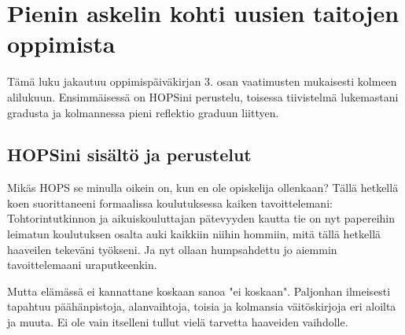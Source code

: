 \documentclass[utf8]{gradu3}
\begin{document}
\chapter{Pienin askelin kohti uusien taitojen oppimista}
\label{hopsJaGradu}

%
%
%
%
%
%
%

Tämä luku jakautuu oppimispäiväkirjan 3. osan vaatimusten mukaisesti kolmeen
alilukuun. Ensimmäisessä on HOPSini perustelu, toisessa tiivistelmä lukemastani
gradusta ja kolmannessa pieni reflektio graduun liittyen.

\section{HOPSini sisältö ja perustelut}

Mikäs HOPS se minulla oikein on, kun en ole opiskelija ollenkaan? Tällä hetkellä
koen suorittaneeni formaalissa koulutuksessa kaiken tavoittelemani:
Tohtorintutkinnon ja aikuiskouluttajan pätevyyden kautta tie on nyt papereihin
leimatun koulutuksen osalta auki kaikkiin niihin hommiin, mitä tällä hetkellä
haaveilen tekeväni työkseni. Ja nyt ollaan humpsahdettu jo aiemmin
tavoittelemaani uraputkeenkin.

Mutta elämässä ei kannattane koskaan sanoa "ei koskaan". Paljonhan ilmeisesti
tapahtuu päähänpistoja, alanvaihtoja, toisia ja kolmansia väitöskirjoja eri
aloilta ja muuta. Ei ole vain itselleni tullut vielä tarvetta haaveiden
vaihdolle.
\end{document}
